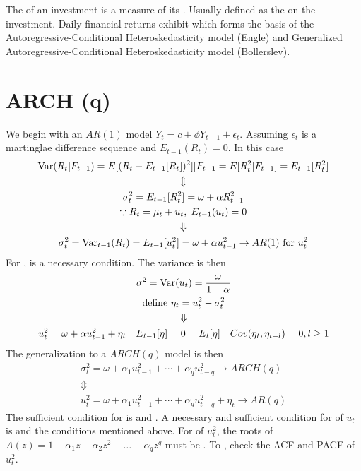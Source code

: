 \ChapterHeading

The  of an investment is a measure of its .
Usually defined as the  on the investment.
Daily financial returns exhibit  which forms the basis of the Autoregressive-Conditional Heteroskedasticity model (Engle) and Generalized Autoregressive-Conditional Heteroskedasticity model (Bollerslev).

\section{ARCH (q)}

We begin with an $AR(1)$ model $Y_t = c + \phi Y_{t-1} + \epsilon_t$.
Assuming $\epsilon_t$ is a martinglae difference sequence and $E_{t-1}(R_t) = 0$.
In this case 
\begin{gather*}
    \operatorname{Var}(R_t|F_{t-1}) = E[(R_t - E_{t-1}[R_t])^2]|F_{t-1} = E[R_t^2|F_{t-1}] = E_{t-1}[R_t^2]\\
    \Updownarrow\\
    \sigma^2_t = E_{t-1}[R_t^2] = \omega + \alpha R^2_{t-1}\\
    \because R_t = \mu_t + u_t,\; E_{t-1}(u_t) = 0\\
    \Downarrow\\
    \sigma^2_t = \operatorname{Var}_{t-1}(R_t) = E_{t-1}[u_t^2] = \omega + \alpha u^2_{t-1}\to AR(1) \text{ for }u_t^2
\end{gather*}
For ,  is a necessary condition.
The variance is then 
\begin{gather*}
    \sigma^2 = \operatorname{Var}(u_t) = \frac{\omega}{1 - \alpha}\\
    \text{define }\eta_t = u^2_t - \sigma_t^2\\
    \Downarrow\\
    u^2_t = \omega + \alpha u^2_{t-1} + \eta_t\quad E_{t-1}[\eta] = 0 = E_t[\eta]\quad Cov(\eta_t,\eta_{t-l}) = 0, l\geq 1
\end{gather*}
The generalization to a $ARCH(q)$ model is then 
\begin{gather*}
    \sigma_t^2 = \omega + \alpha_1 u^2_{t-1} + \cdots + \alpha_q u^2_{t-q} \to ARCH(q)\\
    \Updownarrow\\
    u^2_t = \omega + \alpha_1 u^2_{t-1} + \cdots + \alpha_q u^2_{t-q} + \eta_t \to AR(q)
\end{gather*}
The sufficient condition for  is  and .
A necessary and sufficient condition for  of $u_t$ is  and the conditions mentioned above.
For  of $u^2_t$, the roots of $A(z) = 1 - \alpha_1 z - \alpha_2 z^2 -\ldots - \alpha_q z^q$ must be .
To , check the ACF and PACF of $u^2_t$.

